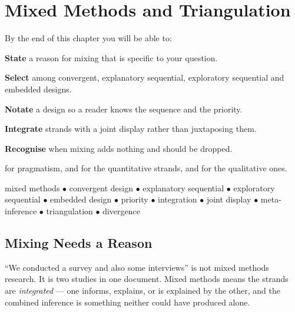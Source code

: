 \chapter{Mixed Methods and Triangulation}\label{ch:mixed}

\begin{outcomes}
By the end of this chapter you will be able to:
\begin{tight}
  \item \textbf{State} a reason for mixing that is specific to your question.
  \item \textbf{Select} among convergent, explanatory sequential, exploratory
    sequential and embedded designs.
  \item \textbf{Notate} a design so a reader knows the sequence and the
    priority.
  \item \textbf{Integrate} strands with a joint display rather than
    juxtaposing them.
  \item \textbf{Recognise} when mixing adds nothing and should be dropped.
\end{tight}
\end{outcomes}

\begin{prereq}
 for pragmatism,  and  for
the quantitative strands,  and  for the
qualitative ones.
\end{prereq}

\begin{keyterms}
mixed methods $\bullet$ convergent design $\bullet$ explanatory sequential
$\bullet$ exploratory sequential $\bullet$ embedded design $\bullet$ priority
$\bullet$ integration $\bullet$ joint display $\bullet$ meta-inference
$\bullet$ triangulation $\bullet$ divergence
\end{keyterms}

\section{Mixing Needs a Reason}

``We conducted a survey and also some interviews'' is not mixed methods
research. It is two studies in one document. Mixed methods means the strands
are \emph{integrated} --- one informs, explains, or is explained by the other,
and the combined inference is something neither could have produced alone.

